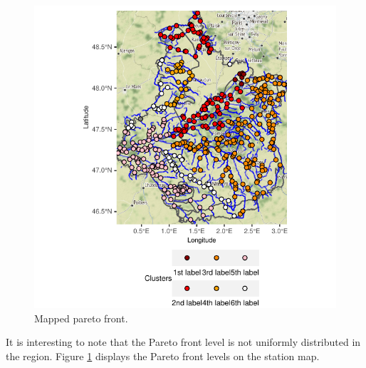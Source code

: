 \begin{itemize}
\end{itemize}

\begin{figure}[htbp]
  \centering
  \includegraphics[]{figs/Chap5/Pareto_map.pdf}
  \caption{Mapped pareto front.}
  \label{fig:pareto:map}
\end{figure}

It is interesting to note that the Pareto front level is not uniformly distributed in the region. Figure \ref{fig:pareto:map} displays the Pareto front levels on the station map.

